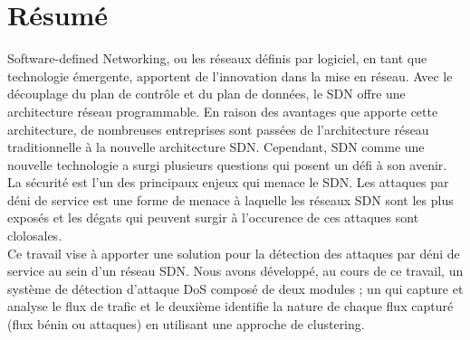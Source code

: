 \chapter{Résumé}

Software-defined Networking, ou les réseaux définis par logiciel, en tant que technologie émergente, apportent de l’innovation dans la mise en réseau. Avec le découplage du plan de contrôle et du plan de données, le SDN offre une architecture  réseau programmable. En raison des avantages que apporte cette architecture, de nombreuses entreprises sont passées de l’architecture réseau traditionnelle à la nouvelle architecture SDN. Cependant, SDN comme une nouvelle technologie a surgi plusieurs questions qui posent un défi à son avenir. La sécurité est l’un des principaux enjeux qui menace le SDN. Les attaques par déni de service est une forme de menace à laquelle les réseaux SDN sont les plus exposés et les dégats qui peuvent surgir à l’occurence de ces attaques sont clolosales.\\

\noindent Ce travail vise à apporter une solution pour la détection des attaques par déni de service au sein d’un réseau SDN. Nous avons développé, au cours de ce travail, un système de détection d’attaque DoS composé de deux modules ; un qui capture et analyse le flux de trafic et le deuxième identifie la nature de chaque flux capturé (flux bénin ou attaques) en utilisant une approche de clustering. 